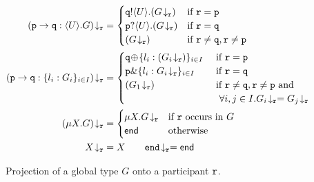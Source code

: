 \documentclass[runningheads]{llncs}
\newcommand{\erase}[1]{#1}
\begin{document}
\begin{figure}[t!]
{%
\begin{align*}
\tproj{(\gtcom{p}{q}{U}{G})}{\gpart{r}} & = 
\begin{cases}
\ltout{\q}{U}{(\tproj{G}{\gpart{r}})} & \text{if $\gpart{r} = \gpart{p}$} \\
\ltinp{\p}{U}{(\tproj{G}{\gpart{r}})} & \text{if $\gpart{r} = \gpart{q}$} \\
(\tproj{G}{\gpart{r}}) &  \text{if $\gpart{r} \neq \gpart{q}, \gpart{r} \neq \gpart{p}$}
\end{cases}
\\
\tproj{(\gtcho{p}{q}{l_i}{G_i})}{\gpart{r}}  
& 
\erase{= 
\begin{cases}
\ltsel{\q}{\lbl_i}{(\tproj{G_i}{\gpart{r}})}{i}{I}  & \text{ if $\gpart{r} = \gpart{p}$} \\
\ltbra{\p}{\lbl_i}{\tproj{G_i}{\gpart{r}}}{i}{I}  & \text{ if $\gpart{r} = \gpart{q}$} \\
(\tproj{{G_1}}{\gpart{r}}) &  \text{ if $\gpart{r} \neq \gpart{q}, \gpart{r} \neq \gpart{p}$ and} \\ 
& \text{~~$\forall i, j \in I. \tproj{{G_i}}{\gpart{r}} = \tproj{{G_j}}{\gpart{r}}$}
\end{cases}
}
\\
\tproj{(\mu X. G)}{\gpart{r}} &= 
\begin{cases}
\mu X. \tproj{G}{\gpart{r}} & \text{if $\gpart{r}$ occurs in $G$}
\\
\lend & \text{otherwise}
\end{cases}
\\
\tproj{X}{\gpart{r}} & = X
\qquad
\tproj{\gend}{\gpart{r}} = \lend
\end{align*}
}
\vspace{-4mm}
\caption{Projection of a global type $G$ onto a participant $\mathtt{r}$.\label{f:proj}}
\end{figure}
\end{document}
